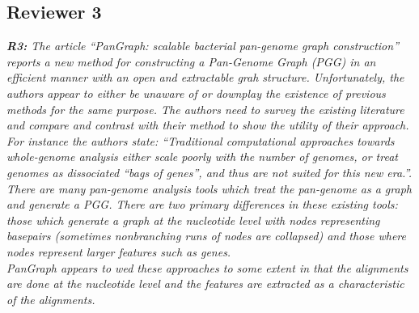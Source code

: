 \documentclass[aps,rmp,onecolumn]{revtex4-1}
\newcommand{\reviewer}[2]{{\it \textbf{#1:} #2\vskip 5mm}}
\begin{document}
\subsection*{Reviewer 3}

\reviewer{R3}{The article ``PanGraph: scalable bacterial pan-genome graph construction'' reports a new method for constructing a Pan-Genome Graph (PGG) in an efficient manner with an open and extractable grah structure. Unfortunately, the authors appear to either be unaware of or downplay the existence of previous methods for the same purpose. The authors need to survey the existing literature and compare and contrast with their method to show the utility of their approach.\\
      For instance the authors state: ``Traditional computational approaches towards whole-genome analysis either scale poorly with the number of genomes, or treat genomes as dissociated ``bags of genes'', and thus are not suited for this new era.''. There are many pan-genome analysis tools which treat the pan-genome as a graph and generate a PGG. There are two primary differences in these existing tools: those which generate a graph at the nucleotide level with nodes representing basepairs (sometimes nonbranching runs of nodes are collapsed) and those where nodes represent larger features such as genes.\\
      PanGraph appears to wed these approaches to some extent in that the alignments are done at the nucleotide level and the features are extracted as a characteristic of the alignments.}
\end{document}
